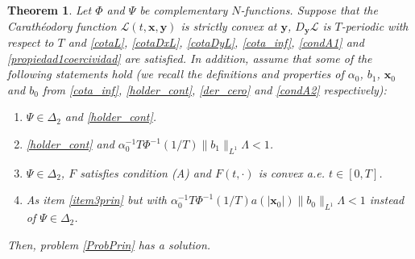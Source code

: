\documentclass[twoside]{elsarticle}
\newtheorem{thm}{Theorem}[section]
\theoremstyle{remark}
\renewcommand{\b}[1]{\boldsymbol{#1}}
\begin{document}
\begin{thm} 
Let $\Phi$ and $\Psi$ be complementary $N$-functions. 
Suppose that the Cara\-th\'eodory function $\mathcal{L}(t,\b{x},\b{y})$ is strictly convex at $\b{y}$, $D_{\b{y}}\mathcal{L}$ is $T$-periodic with respect to $T$  and \eqref{cotaL}, \eqref{cotaDxL}, \eqref{cotaDyL}, \eqref{cota_inf}, \eqref{condA1} and \eqref{propiedad1coercividad} are satisfied. In addition, assume that some of the following statements hold (we recall the definitions and properties of $\alpha_0$, $b_1$, $\b{x}_0$ and $b_0$ from \eqref{cota_inf}, \eqref{holder_cont}, \eqref{der_cero} and \eqref{condA2} respectively):
\begin{enumerate}
  \item\label{item1prin} $\Psi\in\Delta_2$ and  \eqref{holder_cont}.
\item \eqref{holder_cont} and  $\alpha_0^{-1}T\Phi^{-1}\left(1/T\right)\|b_1\|_{L^1}\Lambda<1$.

\item\label{item3prin} $\Psi\in\Delta_2$,  $F$ satisfies condition (A) and  $F(t,\cdot)$ is  convex  a.e. $t\in [0,T]$.

\item\label{item4prin} As item \ref{item3prin} but with $\alpha_0^{-1}T\Phi^{-1}\left(1/T\right)a(|\b{x}_0|)\|b_0\|_{L^1} \Lambda<1$ instead of $\Psi\in\Delta_2$.

\end{enumerate}
Then, problem \eqref{ProbPrin} has a solution.
\end{thm}
\end{document}
